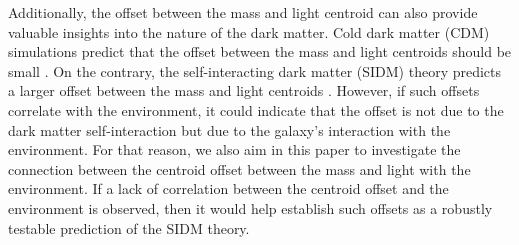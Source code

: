 \documentclass{aa}
\begin{document}
Additionally, the offset between the mass and light centroid can also provide valuable insights into the nature of the dark matter. Cold dark matter (CDM) simulations predict that the offset between the mass and light centroids should be small \citep[$\lesssim$600 pc for 95\% of the galaxies;][]{Schaller15}. On the contrary, the self-interacting dark matter (SIDM) theory predicts a larger offset between the mass and light centroids \citep{Harvey14, Kahlhoefer14, Robertson17}. However, if such offsets correlate with the environment, it could indicate that the offset is not due to the dark matter self-interaction but due to the galaxy's interaction with the environment. For that reason, we also aim in this paper to investigate the connection between the centroid offset between the mass and light with the environment. If a lack of correlation between the centroid offset and the environment is observed, then it would help establish such offsets as a robustly testable prediction of the SIDM theory.


\end{document}
